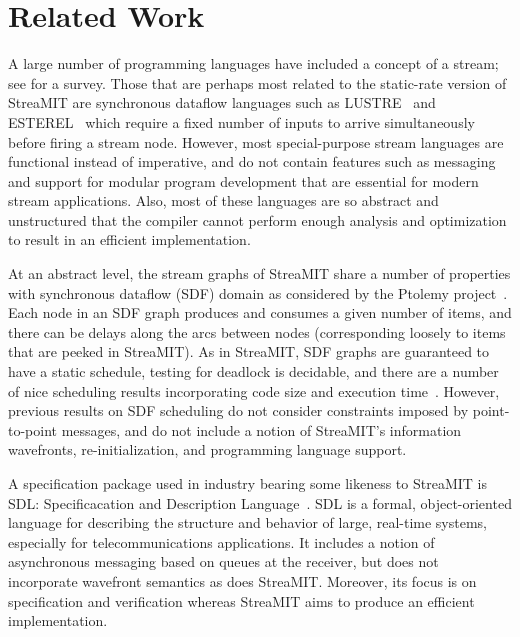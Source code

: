 \section{Related Work}
\label{sec:related}
A large number of programming languages have included a concept of a
stream; see \cite{survey97} for a survey.  Those that are perhaps most
related to the static-rate version of StreaMIT are synchronous
dataflow languages such as LUSTRE~\cite{lustre} and
ESTEREL~\cite{esterel92} which require a fixed number of inputs to
arrive simultaneously before firing a stream node.  However, most
special-purpose stream languages are functional instead of imperative,
and do not contain features such as messaging and support for modular
program development that are essential for modern stream applications.
Also, most of these languages are so abstract and unstructured that
the compiler cannot perform enough analysis and optimization to result
in an efficient implementation.

At an abstract level, the stream graphs of StreaMIT share a number of
properties with synchronous dataflow (SDF) domain as considered by the
Ptolemy project~\cite{ptolemyoverview}.  Each node in an SDF graph
produces and consumes a given number of items, and there can be delays
along the arcs between nodes (corresponding loosely to items that are
peeked in StreaMIT).  As in StreaMIT, SDF graphs are guaranteed to
have a static schedule, testing for deadlock is decidable, and there
are a number of nice scheduling results incorporating code size and
execution time~\cite{leesdf}.  However, previous results on SDF
scheduling do not consider constraints imposed by point-to-point
messages, and do not include a notion of StreaMIT's information
wavefronts, re-initialization, and programming language support.

A specification package used in industry bearing some likeness to
StreaMIT is SDL: Specificacation and Description
Language~\cite{sdlrec}.  SDL is a formal, object-oriented language for
describing the structure and behavior of large, real-time systems,
especially for telecommunications applications.  It includes a notion
of asynchronous messaging based on queues at the receiver, but does
not incorporate wavefront semantics as does StreaMIT.  Moreover, its
focus is on specification and verification whereas StreaMIT aims to
produce an efficient implementation.

